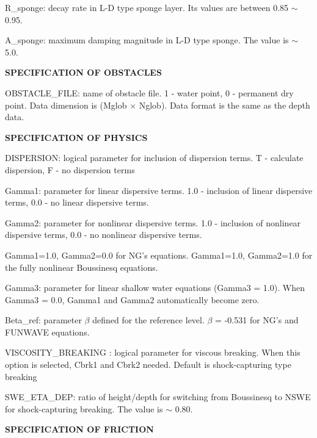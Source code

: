 \documentclass[11pt]{article}
\begin{document}
\begin{description}
\item R\_sponge: decay rate in L-D type sponge layer. Its values are between 0.85 $\sim$ 0.95.

\item A\_sponge: maximum damping magnitude in L-D type sponge. The value is $\sim$ 5.0. 

\item {\bf SPECIFICATION OF OBSTACLES} 

\item OBSTACLE\_FILE: name of obstacle file. 1 - water point, 0 - permanent dry point. Data dimension is (Mglob $\times$ Nglob). Data format is the same as the depth data. 
 
 \item {\bf SPECIFICATION OF PHYSICS} 
  
\item DISPERSION: logical parameter for inclusion of dispersion terms.  T - calculate dispersion, F - no dispersion terms

\item Gamma1: parameter for linear dispersive terms. 1.0 - inclusion of linear dispersive terms, 0.0 - no linear dispersive terms. 

\item Gamma2: parameter for nonlinear dispersive terms. 1.0 - inclusion of nonlinear dispersive terms, 0.0 - no nonlinear dispersive terms. 

  Gamma1=1.0, Gamma2=0.0 for  NG's equations.
  Gamma1=1.0, Gamma2=1.0 for the fully nonlinear Boussinesq equations.
  
\item Gamma3: parameter for linear shallow water equations (Gamma3 = 1.0). When Gamma3 = 0.0, Gamma1 and Gamma2 automatically become zero.   

\item Beta\_ref:  parameter $\beta$ defined for the reference level. $\beta$ = -0.531 for NG's and FUNWAVE equations.

\item VISCOSITY\_BREAKING : logical parameter for viscous breaking. When this option is selected, Cbrk1 and Cbrk2 needed. Default is shock-capturing type breaking

\item SWE\_ETA\_DEP: ratio of height/depth for switching from Boussinesq to NSWE for shock-capturing breaking.  The value is $\sim$ 0.80. 

 \item {\bf SPECIFICATION OF FRICTION} 
  

\end{description}
\end{document}
